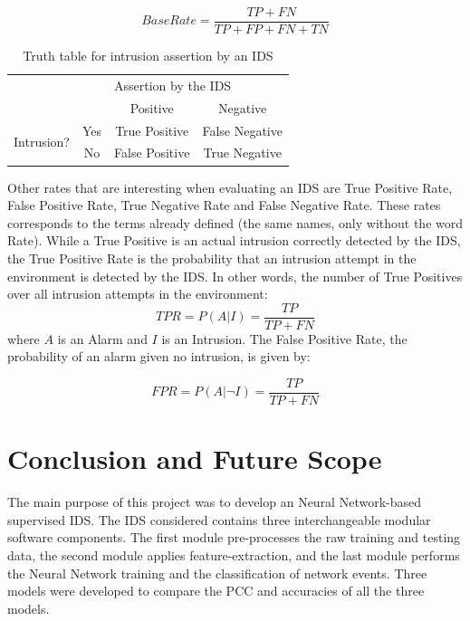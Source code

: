\documentclass[12pt]{article}
\theoremstyle{definition}
\begin{document}
		\begin{equation}
			\label{base-rate-eqn}
			Base Rate = \frac{TP + FN}{TP + FP + FN + TN}
		\end{equation}
		
		\begin{table}[]
			\centering
			\caption{Truth table for intrusion assertion by an IDS}
			\label{table:ids-tt}
			\begin{tabular}{|c|c|c|c|}
				\hline
				\multicolumn{2}{|c|}{\multirow{2}{*}{\textbf{}}} & \multicolumn{2}{l|}{Assertion by the IDS} \\ \cline{3-4} 
				\multicolumn{2}{|c|}{}                           & Positive            & Negative            \\ \hline
				\multirow{2}{*}{Intrusion?}         & Yes        & True Positive       & False Negative      \\ \cline{2-4} 
				& No         & False Positive      & True Negative       \\ \hline
			\end{tabular}
		\end{table}
	
		
	
		Other rates that are interesting when evaluating an IDS are True Positive Rate, False Positive Rate, True Negative Rate and False Negative Rate. These rates corresponds to the terms already defined (the same names, only without the word Rate). While a True Positive is an actual intrusion correctly detected by the IDS, the True Positive Rate is the probability that an intrusion attempt in the environment is detected by the IDS. In other words, the number of True Positives over all intrusion attempts in the environment:
		\begin{equation}
		TPR = P(A | I) = \frac{TP}{TP + FN}
		\end{equation}
		where $ A $ is an Alarm and $ I $ is an Intrusion. The False Positive Rate, the probability of an alarm given no intrusion, is given by:
		
		\begin{equation}
			FPR = P(A | \neg I) = \frac{TP}{TP + FN}
		\end{equation}
		
		

	\cleardoublepage
	\section{Conclusion and Future Scope}
	The main purpose of this project was to develop an Neural Network-based supervised IDS. The IDS considered contains three interchangeable modular software components. The first
	module pre-processes the raw training and testing data, the second module applies feature-extraction, and the last module performs the Neural Network training and the classification of
	network events. Three models were developed to compare the PCC and accuracies of all the three models.
	
\end{document}
